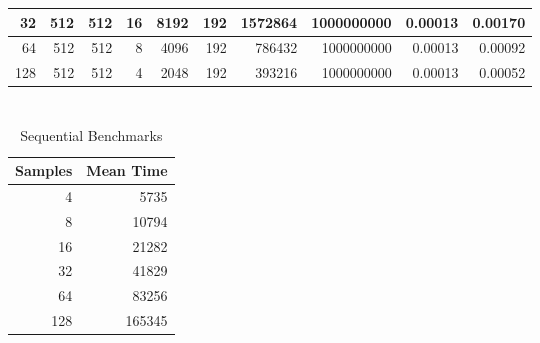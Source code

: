 \documentclass[journal,transmag]{IEEEtran}
\begin{document}
\begin{table}[h]
\begin{tabular}{|r|r|r|r|r|r|r|r|r|r|}
		32                          & 512                        & 512                         & 16                              & 8192                                 & 192                                  & 1572864                                & 1000000000                            & 0.00013                         & 0.00170                       \\ \hline
		64                          & 512                        & 512                         & 8                               & 4096                                 & 192                                  & 786432                                 & 1000000000                            & 0.00013                         & 0.00092                       \\ \hline
		128                         & 512                        & 512                         & 4                               & 2048                                 & 192                                  & 393216                                 & 1000000000                            & 0.00013                         & 0.00052                       \\ \hline
	\end{tabular}
\end{table}

\section{}
	\begin{table}[h]
		\centering
		\caption{Sequential Benchmarks}
		\label{table_seq_data}
		\begin{tabular}{|r|r|}
			\hline
			\multicolumn{1}{|l|}{Samples} & \multicolumn{1}{l|}{Mean Time} \\ \hline
			4                             & 5735                           \\ \hline
			8                             & 10794                          \\ \hline
			16                            & 21282                          \\ \hline
			32                            & 41829                          \\ \hline
			64                            & 83256                          \\ \hline
			128                           & 165345                         \\ \hline
		\end{tabular}
	\end{table}
	\newpage
	
\end{document}
